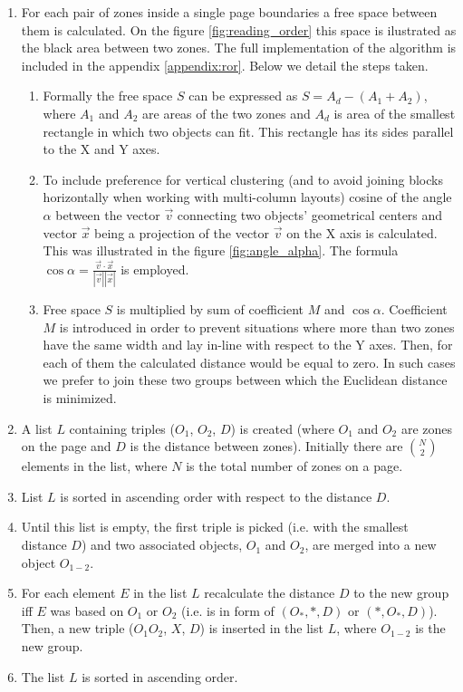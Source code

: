 \begin{enumerate}
\item For each pair of zones inside a single page boundaries a free space between them is calculated. On the figure \ref{fig:reading_order} this space is ilustrated as the black area between two zones. The full implementation of the algorithm is included in the appendix \ref{appendix:ror}. Below we detail the steps taken.
	\begin{enumerate} 
	\item Formally the free space $S$ can be expressed as $S = A_d - (A_1+A_2)$, where $A_1$ and $A_2$ are areas of the two zones and $A_d$ is area of the smallest rectangle in which two objects can fit. This rectangle has its sides parallel to the X and Y axes.
	\item To include preference for vertical clustering (and to avoid joining blocks horizontally when working with multi-column layouts) cosine of the angle $\alpha$ between the vector $\vec{v}$ connecting two objects' geometrical centers and vector $\vec{x}$ being a projection of the vector $\vec{v}$ on the X axis is calculated. This was illustrated in the figure \ref{fig:angle_alpha}. The formula $\cos\alpha = \frac{\vec{v} \cdot \vec{x}}{|\vec{v}||\vec{x}|}$ is employed.
	\item Free space $S$ is multiplied by sum of coefficient $M$ and $\cos\alpha$. Coefficient $M$ is introduced in order to prevent situations where more than two zones have the same width and lay in-line with respect to the Y axes. Then, for each of them the calculated distance would be equal to zero. In such cases we prefer to join these two groups between which the Euclidean distance is minimized.
	\end{enumerate}
\item A list $L$ containing triples ($O_1$, $O_2$, $D$) is created (where $O_1$ and $O_2$ are zones on the page and $D$ is the distance between zones). Initially there are $\binom{N}{2}$ elements in the list, where $N$ is the total number of zones on a page.
\item List $L$ is sorted in ascending order with respect to the distance $D$. 
\item Until this list is empty, the first triple is picked (i.e. with the smallest distance $D$) and two associated objects, $O_1$ and $O_2$, are merged into a new object $O_{1-2}$.
\item For each element $E$ in the list $L$ recalculate the distance $D$ to the new group iff $E$ was based on $O_1$ or $O_2$ (i.e. is in form of $(O_*, *, D)$ or $(*, O_*, D)$). Then, a new triple ($O_1O_2$, $X$, $D$) is inserted in the list $L$, where $O_{1-2}$ is the new group.
\item The list $L$ is sorted in ascending order.
\end{enumerate}
